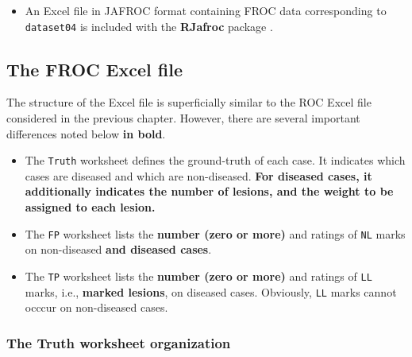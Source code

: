 \documentclass[]{book}
\newenvironment{Shaded}{\begin{snugshade}}{\end{snugshade}}
\newcommand{\CommentTok}[1]{\textcolor[rgb]{0.56,0.35,0.01}{\textit{#1}}}
\newcommand{\DataTypeTok}[1]{\textcolor[rgb]{0.13,0.29,0.53}{#1}}
\newcommand{\KeywordTok}[1]{\textcolor[rgb]{0.13,0.29,0.53}{\textbf{#1}}}
\newcommand{\NormalTok}[1]{#1}
\newcommand{\OperatorTok}[1]{\textcolor[rgb]{0.81,0.36,0.00}{\textbf{#1}}}
\newcommand{\OtherTok}[1]{\textcolor[rgb]{0.56,0.35,0.01}{#1}}
\newcommand{\StringTok}[1]{\textcolor[rgb]{0.31,0.60,0.02}{#1}}
\providecommand{\tightlist}{%
  \setlength{\itemsep}{0pt}\setlength{\parskip}{0pt}}
\begin{document}
\begin{itemize}
\tightlist
\item
  An Excel file in JAFROC format containing FROC data corresponding to \texttt{dataset04} is included with the \textbf{RJafroc} package \citep{RN1882}.
\end{itemize}

\begin{Shaded}
\end{Shaded}

\hypertarget{the-froc-excel-file}{%
\subsection{The FROC Excel file}\label{the-froc-excel-file}}

The structure of the Excel file is superficially similar to the ROC Excel file considered in the previous chapter. However, there are several important differences noted below \textbf{in bold}.

\begin{itemize}
\tightlist
\item
  The \texttt{Truth} worksheet defines the ground-truth of each case. It indicates which cases are diseased and which are non-diseased. \textbf{For diseased cases, it additionally indicates the number of lesions, and the weight to be assigned to each lesion.}
\item
  The \texttt{FP} worksheet lists the \textbf{number (zero or more)} and ratings of \texttt{NL} marks on non-diseased \textbf{and diseased cases}.
\item
  The \texttt{TP} worksheet lists the \textbf{number (zero or more)} and ratings of \texttt{LL} marks, i.e., \textbf{marked lesions}, on diseased cases. Obviously, \texttt{LL} marks cannot occcur on non-diseased cases.
\end{itemize}

\hypertarget{the-truth-worksheet-organization-1}{%
\subsubsection{The Truth worksheet organization}\label{the-truth-worksheet-organization-1}}
\end{document}
